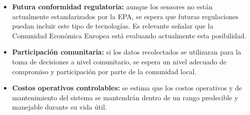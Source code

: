 \begin{itemize}
	\item \textbf{Futura conformidad regulatoria:} aunque los sensores no están actualmente estandarizados por la EPA, se espera que futuras regulaciones puedan incluir este tipo de tecnologías. Es relevante señalar que la Comunidad Económica Europea está evaluando actualmente esta posibilidad.
	
	\item \textbf{Participación comunitaria:} si los datos recolectados se utilizaran para la toma de decisiones a nivel comunitario, se espera un nivel adecuado de compromiso y participación por parte de la comunidad local.
	
	\item \textbf{Costos operativos controlables:} se estima que los costos operativos y de mantenimiento del sistema se mantendrán dentro de un rango predecible y manejable durante su vida útil.
	
\end{itemize}


